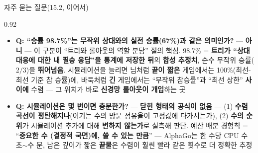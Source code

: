\begin{frame}{자주 묻는 질문(15.2, 이어서)}
\begin{center}\begin{varwidth}{0.92\textwidth}
  \small
  \begin{itemize}
    \item \textbf{Q: ``승률 98.7\%''는 무작위 상대와의 실전
      승률(67\%)과 같은 의미인가?} --- \textbf{아니} --- 이
      구분이 ``트리와 롤아웃의 역할 분담'' 절의 핵심.
      98.7\% = \textbf{트리가 ``상대 대응에 대한 내 필승
      응답''을 통계에 저장한 뒤}의 \textbf{합성 추정치},
      순수 무작위 승률($2/3$)을 \textbf{뛰어넘음}.
      시뮬레이션을 늘리면 님처럼 \textbf{끝이 짧은} 게임에서는
      100\%(최선-최선 기준 참 승률)에, 바둑처럼 \textbf{긴}
      게임에서는 ``무작위 참승률''과 ``최선 상한''
      \textbf{사이에} 수렴 --- 그 위치가 바로 \textbf{신경망
      롤아웃이 개입}하는 곳
    \item \textbf{Q: 시뮬레이션은 몇 번이면 충분한가?} ---
      \textbf{닫힌 형태의 공식이 없음} ---
      (1) \textbf{수렴 곡선이 평탄해지나}(이기는 수의 방문
      점유율이 고정값에 다가서는가), (2) \textbf{수의 순위}가
      시뮬레이션 추가에 대해 \textbf{변하지 않는가}로
      실측해 판단. 예산 배분 경험칙 = ``\textbf{중요한 수
      (결정적 국면)에, 쓸 수 있는 만큼}'' --- AlphaGo는 한
      수당 CPU 수 초$\sim$수 분, 남은 깊이가 짧은 \textbf{끝물}은
      수렴이 훨씬 빨라 같은 횟수로 더 정확한 추정
  \end{itemize}
\end{varwidth}\end{center}
\end{frame}
